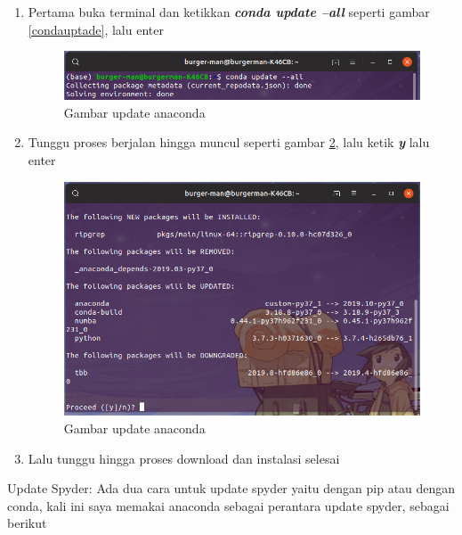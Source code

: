 \begin{enumerate}
\item Pertama buka terminal dan ketikkan \textbf{\textit{conda update --all}} seperti gambar \ref{condauptade}, lalu enter
\begin{figure}[H]
\centering
\includegraphics[width=1\textwidth]{figures/updateconda.png}
\caption{Gambar update anaconda}
\label{updateconda}
\end{figure}

\item Tunggu proses berjalan hingga muncul seperti gambar \ref{pressy}, lalu ketik \textbf{\textit{y}} lalu enter
\begin{figure}[H]
\centering
\includegraphics[width=1\textwidth]{figures/pressy.png}
\caption{Gambar update anaconda}
\label{pressy}
\end{figure}

\item Lalu tunggu hingga proses download dan instalasi selesai
\end{enumerate}

Update Spyder:
Ada dua cara untuk update spyder yaitu dengan pip atau dengan conda, kali ini saya memakai anaconda sebagai perantara update spyder, sebagai berikut

